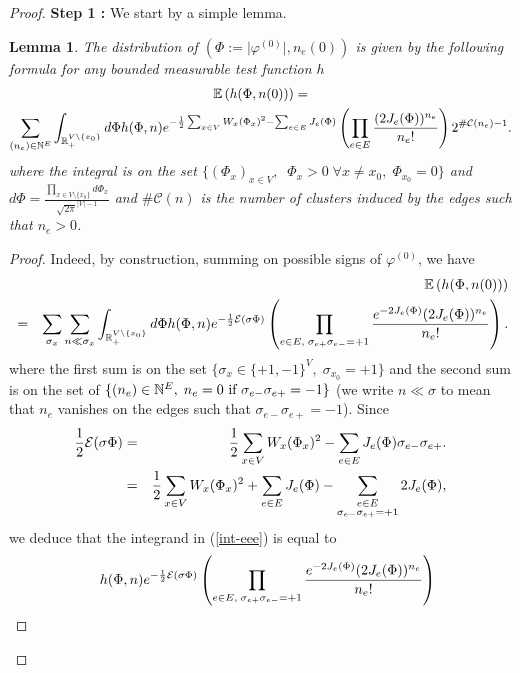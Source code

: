 \documentclass[11pt,a4paper]{amsart}
\numberwithin{equation}{section}
\newtheorem{lemma}[proposition]{Lemma}
\def\ccc{{\mathcal C}}
\def\R{{\mathbb R}}
\def\N{{\mathbb N}}
\def\E{{\mathbb{E}}}
\def\demi{{1\over 2}}
\def\eee{{\mathcal E}}
\begin{document}
\begin{proof}
{\bf Step 1 :}
We start by a simple lemma.
\begin{lemma}\label{distrib-phi-n}
The distribution of $(\Phi:=\vert \varphi^{(0)}\vert, n_e(0))$ is given by the following formula for any bounded measurable test function $h$
\begin{multline*}
\E\left(h(\Phi, n(0))\right)= \\\sum_{(n_e)\in \N^E} \int_{\R_+^{V\setminus\{x_0\}}} d\Phi  h(\Phi, n) 
e^{-\demi \sum_{x\in V} W_x(\Phi_x)^2-\sum_{e\in E} J_e(\Phi)}
\left(\prod_{e\in E}{\frac{(2J_e(\Phi))^{n_e}}{n_e!}}\right)
2^{\#\ccc(n_e)-1}.
\end{multline*}
where the integral is on the set $\{(\Phi_x)_{x\in V}, \;\; \Phi_x>0\; \forall x\neq x_0,\; \Phi_{x_0}=0\}$ and 
$d\Phi={\frac{\prod_{x\in V\setminus\{x_0\}} d\Phi_x}{\sqrt{2\pi}^{\vert V\vert -1}}}$  
and $\#\ccc(n)$ is the number of clusters 
induced by the edges such that $n_e>0$.
\end{lemma}
\begin{proof}
Indeed, by construction, summing on possible signs of $\varphi^{(0)}$, we have
\begin{eqnarray}
\nonumber
&&\E\left(h(\Phi, n(0))\right)
\\
\label{int-eee}&=&\sum_{\sigma_x}
 \sum_{n\ll \sigma_x}
 \int_{\R_+^{V\setminus\{x_0\}}} d\Phi  h(\Phi, n) e^{-\demi \eee(\sigma\Phi)}\left(\prod_{e\in E, \; \sigma_{e+}\sigma_{e-}=+1} {e^{-2J_e(\Phi)} (2J_e(\Phi))^{n_e}\over n_e!}\right).
 \end{eqnarray}
where the first sum is on the set $\{\sigma_x\in \{+1,-1\}^V, \; \sigma_{x_0}=+1\}$ and the second sum is on the set of
$\{(n_e)\in \N^E, \; n_e=0\hbox{ if $\sigma_{e-}\sigma_{e+}=-1$}\}$ (we write $n\ll \sigma$ to mean that $n_e$ vanishes on the edges
such that  $\sigma_{e-}\sigma_{e+}=-1$). Since
\begin{eqnarray*}
\demi\eee(\sigma \Phi)&=& \demi\sum_{x\in V} W_x (\Phi_x)^2-\sum_{e\in E} J_e(\Phi)\sigma_{e-}\sigma_{e+}.
\\
&=&
 \demi\sum_{x\in V} W_x (\Phi_x)^2+\sum_{e\in E} J_e(\Phi) 
 -\sum_{\substack{e\in E\\\sigma_{e-}\sigma_{e+}=+1}} 2J_e(\Phi),
\end{eqnarray*}
we deduce that the integrand in (\ref{int-eee}) is equal to
\begin{eqnarray*}
 && h(\Phi,n) e^{-\demi \eee(\sigma\Phi)}\left(\prod_{e\in E, \; \sigma_{e+}\sigma_{e-}=+1} {e^{-2J_e(\Phi)} (2J_e(\Phi))^{n_e}\over n_e!}\right)

\end{eqnarray*}
\end{proof}
\end{proof}
\end{document}
